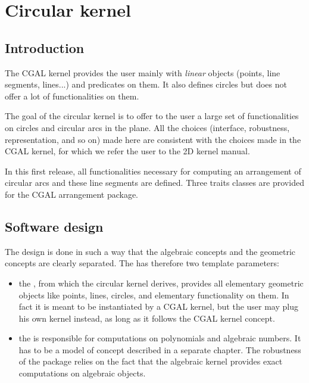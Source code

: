 \chapter{Circular kernel}
\label{chapter-circular-kernel}


\section{Introduction}

The CGAL kernel provides the user mainly with \textit{linear} objects
(points, line segments, lines...) and predicates on them. It also
defines circles but does not offer a lot of functionalities on them. 

The goal of the circular kernel is to offer to the user a large set of
functionalities on circles and circular arcs in the plane. All the
choices (interface, robustness, representation, and so on) made here
are consistent with the choices made in the CGAL kernel, for which we
refer the user to the 2D kernel manual. 

In this first release, all functionalities necessary for computing an
arrangement of circular arcs and these line segments are
defined. Three traits classes are provided for the CGAL arrangement
package. 

\section{Software design}

The design is done in such a way that the algebraic concepts and the
geometric concepts are clearly separated. The 
has therefore two template parameters: 
\begin{itemize}
\item {} the , from which the circular kernel derives,
provides all elementary geometric objects like points, lines, circles, and
elementary functionality on them. In fact it is meant to be
instantiated by a CGAL kernel,  but the user may plug his own kernel
instead, as long as it follows the CGAL kernel concept. 
\item {} the  is responsible for computations on
polynomials and algebraic numbers. It has to be a model of concept 
 described in a separate chapter. The
robustness of the package relies on the fact that the algebraic kernel
provides exact computations on algebraic objects.
\end{itemize}

